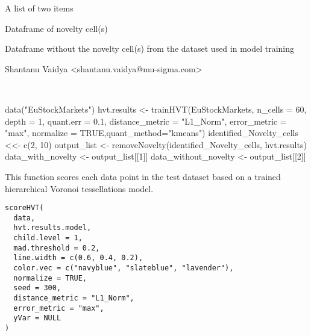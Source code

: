 \documentclass[letterpaper]{book}
\begin{document}
%
\begin{Value}
A list of two items
\begin{ldescription}
\item[\code{[[1]] }] Dataframe of novelty cell(s)
\item[\code{[[2]] }] Dataframe without the novelty cell(s) from the dataset used in model training
\end{ldescription}
\end{Value}
%
\begin{Author}
Shantanu Vaidya <shantanu.vaidya@mu-sigma.com>
\end{Author}
%
\begin{SeeAlso}
 \\{} 
\end{SeeAlso}
%
\begin{Examples}
\begin{ExampleCode}
data("EuStockMarkets")
hvt.results <- trainHVT(EuStockMarkets, n_cells = 60, depth = 1, quant.err = 0.1, 
                       distance_metric = "L1_Norm", error_metric = "max",
                       normalize = TRUE,quant_method="kmeans")
identified_Novelty_cells <<- c(2, 10)
output_list <- removeNovelty(identified_Novelty_cells, hvt.results) 
data_with_novelty <- output_list[[1]]
data_without_novelty <- output_list[[2]]                      
\end{ExampleCode}
\end{Examples}
%
\begin{Description}
This function scores each data point in the test dataset based on a trained hierarchical Voronoi tessellations model.
\end{Description}
%
\begin{Usage}
\begin{verbatim}
scoreHVT(
  data,
  hvt.results.model,
  child.level = 1,
  mad.threshold = 0.2,
  line.width = c(0.6, 0.4, 0.2),
  color.vec = c("navyblue", "slateblue", "lavender"),
  normalize = TRUE,
  seed = 300,
  distance_metric = "L1_Norm",
  error_metric = "max",
  yVar = NULL
)
\end{verbatim}
\end{Usage}
%
\end{document}

